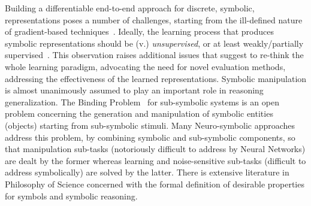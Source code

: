Building a differentiable end-to-end approach for discrete, symbolic, representations poses a number of challenges, starting from the ill-defined nature of gradient-based techniques~\cite{poganvcic2020differentiation}.
%
Ideally, the learning process that produces symbolic representations should be (v.) \textit{unsupervised}, or at least weakly/partially supervised~\cite{stammer2022interactive}. This observation raises additional issues that suggest to re-think the whole learning paradigm, advocating the need for novel evaluation methods, addressing the effectiveness of the learned representations.
%
%
Symbolic manipulation is almost unanimously assumed to play an important role in reasoning generalization. The Binding Problem~\cite{greff2020binding} for sub-symbolic systems is an open problem concerning the generation and manipulation of symbolic entities (objects) starting from sub-symbolic stimuli. Many Neuro-symbolic approaches address this problem, by combining symbolic and sub-symbolic components, so that manipulation sub-tasks (notoriously difficult to address by Neural Networks) are dealt by the former whereas learning and noise-sensitive sub-tasks (difficult to address symbolically) are solved by the latter.
%
There is extensive literature in Philosophy of Science concerned with the formal definition of desirable properties for symbols and symbolic reasoning.
